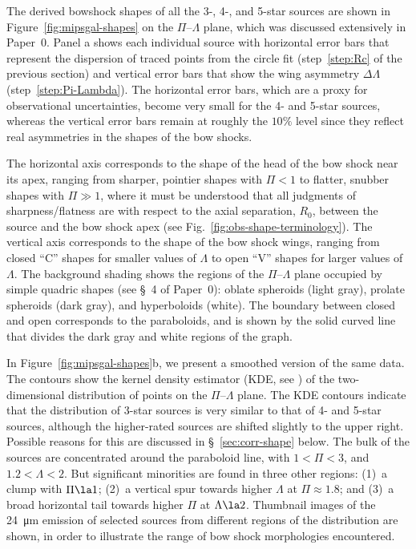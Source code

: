 The derived bowshock shapes of all the 3-, 4-, and 5-star sources are
shown in Figure~\ref{fig:mipsgal-shapes} on the \(\Pi\)--\(\Lambda\) plane,
which was discussed extensively in Paper~0.  Panel a shows each
individual source with horizontal error bars that represent the
dispersion of traced points from the circle fit (step~\ref{step:Rc} of
the previous section) and vertical error bars that show the wing
asymmetry \(\Delta\Lambda\) (step~\ref{step:Pi-Lambda}).  The horizontal error
bars, which are a proxy for observational uncertainties, become very
small for the 4- and 5-star sources, whereas the vertical error bars
remain at roughly the \(10\%\) level since they reflect real
asymmetries in the shapes of the bow shocks.

The horizontal axis corresponds to the shape of the head of the bow
shock near its apex, ranging from sharper, pointier shapes with
\(\Pi < 1\) to flatter, snubber shapes with \(\Pi \gg 1\), where it must be
understood that all judgments of sharpness/flatness are with respect
to the axial separation, \(R_0\), between the source and the bow shock
apex (see Fig.~\ref{fig:obs-shape-terminology}).  The vertical axis
corresponds to the shape of the bow shock wings, ranging from closed
``C'' shapes for smaller values of \(\Lambda\) to open ``V'' shapes for
larger values of \(\Lambda\).  The background shading shows the regions of
the \(\Pi\)--\(\Lambda\) plane occupied by simple quadric shapes (see \S~4 of
Paper~0): oblate spheroids (light gray), prolate spheroids (dark
gray), and hyperboloids (white). The boundary between closed and open
corresponds to the paraboloids, and is shown by the solid curved line
that divides the dark gray and white regions of the graph.

In Figure~\ref{fig:mipsgal-shapes}b, we present a smoothed version of
the same data.  The contours show the kernel density estimator (KDE,
see \citealp{Leiva-Murillo:2012a, Scott:2015a}) of the two-dimensional
distribution of points on the \(\Pi\)--\(\Lambda\) plane.  The KDE contours
indicate that the distribution of 3-star sources is very similar to
that of 4- and 5-star sources, although the higher-rated sources are
shifted slightly to the upper right.  Possible reasons for this are
discussed in \S~\ref{sec:corr-shape} below.
The bulk of the sources are concentrated around the paraboloid line,
with \(1 < \Pi < 3\), and \(1.2 < \Lambda < 2\).  But significant minorities
are found in three other regions: (1)~a clump with \(\Pi \la 1\); (2)~a
vertical spur towards higher \(\Lambda\) at \(\Pi \approx 1.8\); and (3)~a broad
horizontal tail towards higher \(\Pi\) at \(\Lambda \la 2\).  Thumbnail images
of the \SI{24}{\um} emission of selected sources from different
regions of the distribution are shown, in order to illustrate the
range of bow shock morphologies encountered.

